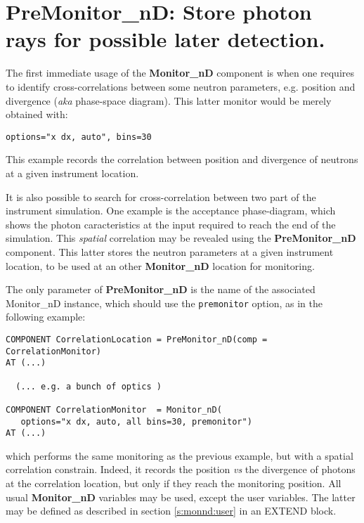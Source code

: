 \section{PreMonitor\_nD: Store photon rays for possible later detection.}

The first immediate usage of the \textbf{Monitor\_nD} component is when one requires to
identify cross-correlations between some neutron parameters, e.g. position and
divergence (\textit{aka} phase-space diagram). This latter monitor would be
merely obtained with:
\begin{verbatim}
options="x dx, auto", bins=30
\end{verbatim}
This example records the correlation between position and divergence of neutrons at a given instrument location.

It is also possible to search for cross-correlation between two part of the
instrument simulation. One example is the acceptance phase-diagram, which shows
the photon caracteristics at the input required to reach the end of the
simulation. This \emph{spatial} correlation may be revealed using the
\textbf{PreMonitor\_nD} component. This latter stores the neutron parameters at
a given instrument location, to be used at an other \textbf{Monitor\_nD} location for
monitoring.

The only parameter of \textbf{PreMonitor\_nD} is the name of the associated
Monitor\_nD instance, which should use the \verb+premonitor+ option, as in the
following example:
\begin{verbatim}
COMPONENT CorrelationLocation = PreMonitor_nD(comp = CorrelationMonitor)
AT (...)

  (... e.g. a bunch of optics )

COMPONENT CorrelationMonitor  = Monitor_nD(
   options="x dx, auto, all bins=30, premonitor")
AT (...)
\end{verbatim}
which performs the same monitoring as the previous example, but with a spatial
correlation constrain. Indeed, it records the position \textit{vs} the
divergence of photons at the correlation location, but only if they reach the
monitoring position. All usual \textbf{Monitor\_nD} variables may be used, except the
user variables. The latter may be defined as described in section
\ref{s:monnd:user} in an EXTEND block.
